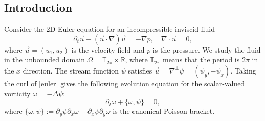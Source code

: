\documentclass[1 [leqno, 11pt]{amsart}
\numberwithin{equation}{section}
\begin{document}
\begin{CJK*}{GBK}{song}
\section{Introduction}
Consider the 2D Euler equation  for an incompressible inviscid fluid
 \begin{equation}\label{euler}
 \partial_t \vec{u} + (\vec{u}\cdot \nabla) \vec{u}  = -\nabla p, \quad \nabla \cdot \vec{u} = 0,
 \end{equation}
where $\vec{u} = (u_1, u_2)$ is the velocity field  and $p$ is the pressure. We study the fluid in the unbounded domain
$\Omega=\mathbb{T}_{2\pi}\times \mathbb{R}$, where $\mathbb{T}_{2\pi}$ means that the period is $2\pi$ in the $x$ direction.
The stream function $\psi$  satisfies   $ \vec{u} = \nabla ^\bot \psi = (\psi_y, -\psi_x)$.
 Taking the curl of \eqref{euler} gives the following evolution equation for the scalar-valued vorticity $\omega =- \Delta \psi$:
\begin{equation} \label{vor}
\partial_t \omega +  \{\omega , \psi\} = 0,
\end{equation}
where  $\{\omega , \psi\}  := \partial_y\psi \partial_x \omega - \partial_x\psi\partial_y \omega$ is the canonical Poisson bracket.


\end{CJK*}
\end{document}
